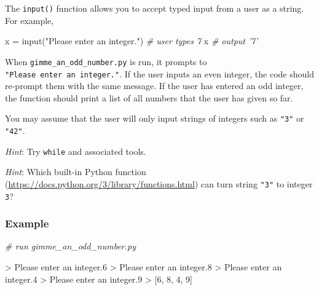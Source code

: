 \documentclass[11pt]{article}
\newenvironment{Shaded}{}{}
\newcommand{\DecValTok}[1]{\textcolor[rgb]{0.25,0.63,0.44}{{#1}}}
\newcommand{\StringTok}[1]{\textcolor[rgb]{0.25,0.44,0.63}{{#1}}}
\newcommand{\CommentTok}[1]{\textcolor[rgb]{0.38,0.63,0.69}{\textit{{#1}}}}
\newcommand{\NormalTok}[1]{{#1}}
\newcommand{\OperatorTok}[1]{\textcolor[rgb]{0.40,0.40,0.40}{{#1}}}
\newcommand{\BuiltInTok}[1]{{#1}}
\begin{document}
The \texttt{input()} function allows you to accept typed input from a
user as a string. For example,

\begin{Shaded}
\begin{Highlighting}[]
\NormalTok{x }\OperatorTok{=} \BuiltInTok{input}\NormalTok{(}\StringTok{"Please enter an integer."}\NormalTok{)}
\CommentTok{# user types 7}
\NormalTok{x}
\CommentTok{# output }
\CommentTok{'7'}
\end{Highlighting}
\end{Shaded}

When \texttt{gimme\_an\_odd\_number.py} is run, it prompts to
\texttt{"Please\ enter\ an\ integer."}. If the user inputs an even
integer, the code should re-prompt them with the same message. If the
user has entered an odd integer, the function should print a list of all
numbers that the user has given so far.

You may assume that the user will only input strings of integers such as
\texttt{"3"} or \texttt{"42"}.

\emph{Hint}: Try \texttt{while} and associated tools.

\emph{Hint}: Which built-in Python function
(\url{https://docs.python.org/3/library/functions.html}) can turn string
\texttt{"3"} to integer \texttt{3}?

\subsubsection{Example}\label{example}

\begin{Shaded}
\begin{Highlighting}[]

\CommentTok{# run gimme_an_odd_number.py}

\OperatorTok{>}\NormalTok{ Please enter an integer.}\DecValTok{6}
\OperatorTok{>}\NormalTok{ Please enter an integer.}\DecValTok{8}
\OperatorTok{>}\NormalTok{ Please enter an integer.}\DecValTok{4}
\OperatorTok{>}\NormalTok{ Please enter an integer.}\DecValTok{9}
\OperatorTok{>}\NormalTok{ [}\DecValTok{6}\NormalTok{, }\DecValTok{8}\NormalTok{, }\DecValTok{4}\NormalTok{, }\DecValTok{9}\NormalTok{]}
\end{Highlighting}
\end{Shaded}
\end{document}
